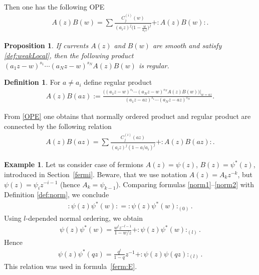 \documentclass[pdftex]{sigma}
\numberwithin{equation}{section}
\newtheorem{Proposition}[Theorem]{Proposition}
\theoremstyle{definition}
\newtheorem{Example}[Theorem]{Example}
\newtheorem{Definition}[Theorem]{Definition}
\begin{document}
Then one has the following OPE
\begin{gather}
A(z) B(w) = \sum \frac{C_{j}^{(i)} \! (w)}{(a_i z)^j \big(1-\frac{w}{a_i z} \big)^{j}}+: \! A(z) B(w) \! :. \label{OPE}
\end{gather}
\begin{Proposition}
If currents $A(z)$ and $B(w)$ are smooth and satisfy \eqref{def:weakLocal}, then the following product \mbox{$(a_1 z - w)^{s_1} \cdots (a_N z - w)^{s_N} A(z) B(w)$} is regular.
\end{Proposition}
\begin{Definition} \label{def: the product}
For $a \neq a_i$ define regular product
\begin{gather*}
A(z) B(az) := \frac{ \big( (a_1 z - w)^{s_1} \cdots (a_N z - w)^{s_N} A(z) B(w) \big) \big|_{w=az}}{(a_1 z - az)^{s_1} \cdots (a_N z - az)^{s_N}}.
\end{gather*}
\end{Definition}

From \eqref{OPE} one obtains that normally ordered product and regular product are connected by the following relation
\begin{gather*}
A(z) B(az) = \sum \frac{C_{j}^{(i)} \! (az)}{(a_i z)^j (1-a/a_i)^{j}}+: \! A(z) B(az) \! :.
\end{gather*}

\begin{Example}
Let us consider case of fermions $A(z) = \psi(z)$, $B(z) = \psi^*(z)$, introduced in Section~\ref{fermi}. Beware, that we use notation $A(z)=A_k z^{-k}$, but $\psi(z) = \psi_i z^{-i-1}$ (hence \mbox{$A_k = \psi_{k-1}$}). Comparing formulas \eqref{norm1}--\eqref{norm2} with Definition \ref{def:norm}, we conclude
\begin{gather*}
{: \! \psi(z) \psi^* (w) \! :} = : \psi(z) \psi^*(w):_{(0)}.
\end{gather*}
Using $l$-depended normal ordering, we obtain
\begin{gather} \label{eq: regul prod psipsi}
\psi(z) \psi^* (w) = \frac{w^l z^{-l-1}}{1-w/z} + : \! \psi (z) \psi^* (w) \! :_{(l)}.
\end{gather}
Hence
\begin{gather*}
\psi(z) \psi^* (q z) = \frac{q^l}{1-q} z^{-1} + : \! \psi (z) \psi(qz) \! :_{(l)}.
\end{gather*}
This relation was used in formula~\eqref{ferm:E}.
\end{Example}
\end{document}
